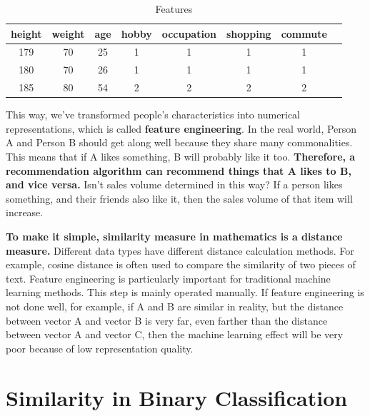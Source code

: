 \documentclass[oneside]{book}
\begin{document}
\begin{table}[H]
        \centering
        \begin{tabular}{cccccccc}
        \hline
        height & weight & age & hobby & occupation & shopping & commute \\
        \hline
        179 & 70 & 25 & 1 & 1 & 1 & 1 \\
        180 & 70 & 26 & 1 & 1 & 1 & 1 \\
        185 & 80 & 54 & 2 & 2 & 2 & 2 \\
        \hline
        \end{tabular}
        \caption{Features}
\end{table}

This way, we've transformed people's characteristics into numerical representations, which is called \textbf{feature engineering}.
In the real world, Person A and Person B should get along well because they share many commonalities. This means that if A likes something, B will probably like it too. \textbf{Therefore, a recommendation algorithm can recommend things that A likes to B, and vice versa.}
Isn't sales volume determined in this way? If a person likes something, and their friends also like it, then the sales volume of that item will increase.

\textbf{To make it simple, similarity measure in mathematics is a distance measure.}
Different data types have different distance calculation methods. For example, cosine distance is often used to compare the similarity of two pieces of text.
Feature engineering is particularly important for traditional machine learning methods. This step is mainly operated manually. If feature engineering is not done well, for example, if A and B are similar in reality, but the distance between vector A and vector B is very far, even farther than the distance between vector A and vector C, then the machine learning effect will be very poor because of low representation quality.

\section{Similarity in Binary Classification}
\end{document}
